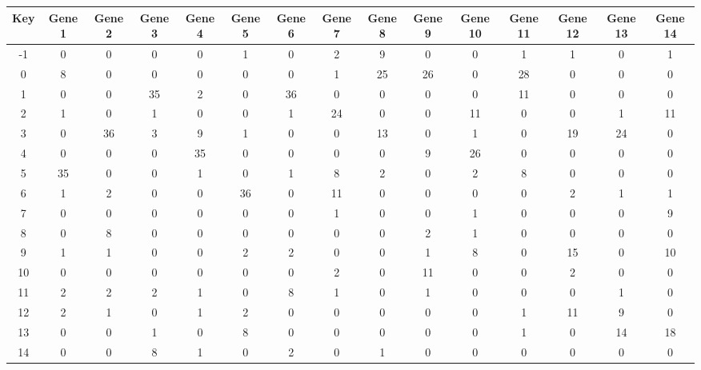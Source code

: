 \begin{tabular}{|c|c|c|c|c|c|c|c|c|c|c|c|c|c|c|}
\hline
Key & Gene 1 & Gene 2 & Gene 3 & Gene 4 & Gene 5 & Gene 6 & Gene 7 & Gene 8 & Gene 9 & Gene 10 & Gene 11 & Gene 12 & Gene 13 & Gene 14 \\
\hline
-1 & 0 & 0 & 0 & 0 & 1 & 0 & 2 & 9 & 0 & 0 & 1 & 1 & 0 & 1 \\
0 & 8 & 0 & 0 & 0 & 0 & 0 & 1 & 25 & 26 & 0 & 28 & 0 & 0 & 0 \\
1 & 0 & 0 & 35 & 2 & 0 & 36 & 0 & 0 & 0 & 0 & 11 & 0 & 0 & 0 \\
2 & 1 & 0 & 1 & 0 & 0 & 1 & 24 & 0 & 0 & 11 & 0 & 0 & 1 & 11 \\
3 & 0 & 36 & 3 & 9 & 1 & 0 & 0 & 13 & 0 & 1 & 0 & 19 & 24 & 0 \\
4 & 0 & 0 & 0 & 35 & 0 & 0 & 0 & 0 & 9 & 26 & 0 & 0 & 0 & 0 \\
5 & 35 & 0 & 0 & 1 & 0 & 1 & 8 & 2 & 0 & 2 & 8 & 0 & 0 & 0 \\
6 & 1 & 2 & 0 & 0 & 36 & 0 & 11 & 0 & 0 & 0 & 0 & 2 & 1 & 1 \\
7 & 0 & 0 & 0 & 0 & 0 & 0 & 1 & 0 & 0 & 1 & 0 & 0 & 0 & 9 \\
8 & 0 & 8 & 0 & 0 & 0 & 0 & 0 & 0 & 2 & 1 & 0 & 0 & 0 & 0 \\
9 & 1 & 1 & 0 & 0 & 2 & 2 & 0 & 0 & 1 & 8 & 0 & 15 & 0 & 10 \\
10 & 0 & 0 & 0 & 0 & 0 & 0 & 2 & 0 & 11 & 0 & 0 & 2 & 0 & 0 \\
11 & 2 & 2 & 2 & 1 & 0 & 8 & 1 & 0 & 1 & 0 & 0 & 0 & 1 & 0 \\
12 & 2 & 1 & 0 & 1 & 2 & 0 & 0 & 0 & 0 & 0 & 1 & 11 & 9 & 0 \\
13 & 0 & 0 & 1 & 0 & 8 & 0 & 0 & 0 & 0 & 0 & 1 & 0 & 14 & 18 \\
14 & 0 & 0 & 8 & 1 & 0 & 2 & 0 & 1 & 0 & 0 & 0 & 0 & 0 & 0 \\
\hline
\end{tabular}